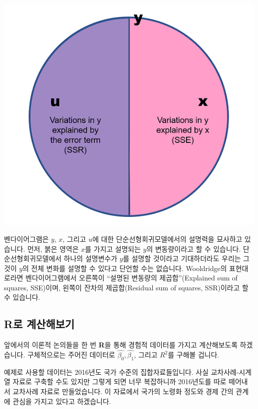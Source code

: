 \documentclass[
]{book}
\begin{document}
\begin{center}\includegraphics[width=7.88in]{figures/Venndiagram} \end{center}

벤다이어그램은 \(y\), \(x\), 그리고 \(u\)에 대한 단순선형회귀모델에서의 설명력을 묘사하고 있습니다. 먼저, 붉은 영역은 \(x\)를 가지고 설명되는 \(y\)의 변동량이라고 할 수 있습니다. 단순선형회귀모델에서 하나의 설명변수가 \(y\)를 설명할 것이라고 기대하더라도 우리는 그것이 \(y\)의 전체 변화를 설명할 수 있다고 단언할 수는 없습니다. Wooldridge의 표현대로라면 벤다이어그램에서 오른쪽이 ``설명된 변동량의 제곱합''(Explained sum of squares, SSE)이며, 왼쪽이 잔차의 제곱합(Residual sum of squares, SSR)이라고 할 수 있습니다.

\hypertarget{ruxb85c-uxacc4uxc0b0uxd574uxbcf4uxae30}{%
\subsection{\texorpdfstring{\textbf{R}로 계산해보기}{R로 계산해보기}}\label{ruxb85c-uxacc4uxc0b0uxd574uxbcf4uxae30}}

앞에서의 이론적 논의들을 한 번 \textbf{R}을 통해 경험적 데이터를 가지고 계산해보도록 하겠습니다. 구체적으로는 주어진 데이터로 \(\hat{\beta_0}, \hat{\beta_1}\), 그리고 \(R^2\)를 구해볼 겁니다.

예제로 사용할 데이터는 2016년도 국가 수준의 집합자료들입니다. 사실 교차사례-시계열 자료로 구축할 수도 있지만 그렇게 되면 너무 복잡하니까 2016년도를 따로 떼어내서 교차사례 자료로 만들었습니다. 이 자료에서 국가의 노령화 정도와 경제 간의 관계에 관심을 가지고 있다고 하겠습니다.
\end{document}

